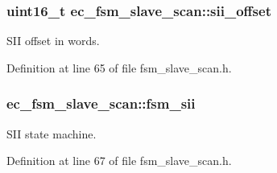 \subsubsection[{sii\-\_\-offset}]{\setlength{\rightskip}{0pt plus 5cm}uint16\-\_\-t {\bf ec\-\_\-fsm\-\_\-slave\-\_\-scan\-::sii\-\_\-offset}}\label{structec__fsm__slave__scan_a8cb75bc7d08ed43d9915f1d2a4411d5f}


\-S\-I\-I offset in words. 



\-Definition at line 65 of file fsm\-\_\-slave\-\_\-scan.\-h.

\subsubsection[{fsm\-\_\-sii}]{ {\bf ec\-\_\-fsm\-\_\-slave\-\_\-scan\-::fsm\-\_\-sii}}\label{structec__fsm__slave__scan_a711257451b14076272e1731592a42b61}


\-S\-I\-I state machine. 



\-Definition at line 67 of file fsm\-\_\-slave\-\_\-scan.\-h.

